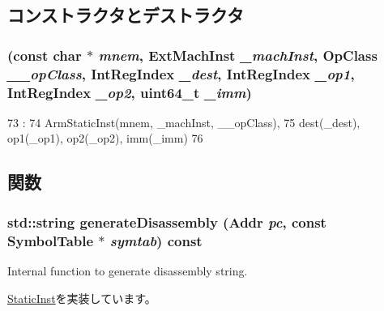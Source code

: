 \subsection{コンストラクタとデストラクタ}
\hypertarget{classRegRegRegImmOp64_ae58b40cb80b0c25cac8d38ab91bed20b}{
\subsubsection[{RegRegRegImmOp64}]{ (const char $\ast$ {\em mnem}, \/  {\bf ExtMachInst} {\em \_\-machInst}, \/  OpClass {\em \_\-\_\-opClass}, \/  {\bf IntRegIndex} {\em \_\-dest}, \/  {\bf IntRegIndex} {\em \_\-op1}, \/  {\bf IntRegIndex} {\em \_\-op2}, \/  uint64\_\-t {\em \_\-imm})}}
\label{classRegRegRegImmOp64_ae58b40cb80b0c25cac8d38ab91bed20b}



\begin{DoxyCode}
73                                                       :
74         ArmStaticInst(mnem, _machInst, __opClass),
75         dest(_dest), op1(_op1), op2(_op2), imm(_imm)
76     {}

\end{DoxyCode}


\subsection{関数}
\hypertarget{classRegRegRegImmOp64_a95d323a22a5f07e14d6b4c9385a91896}{
\subsubsection[{generateDisassembly}]{\setlength{\rightskip}{0pt plus 5cm}std::string generateDisassembly ({\bf Addr} {\em pc}, \/  const SymbolTable $\ast$ {\em symtab}) const}}
\label{classRegRegRegImmOp64_a95d323a22a5f07e14d6b4c9385a91896}
Internal function to generate disassembly string. 

\hyperlink{classStaticInst_ab4a569d2623620c04f8a52bbd91d63b9}{StaticInst}を実装しています。


